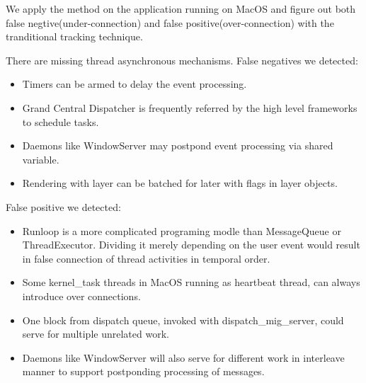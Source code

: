 \par
We apply the method on the application running on MacOS and figure out both false negtive(under-connection) and false positive(over-connection) with the tranditional tracking technique.
\par
There are missing thread asynchronous mechanisms. False negatives we detected:
\begin{itemize}
\item Timers can be armed to delay the event processing.
\item Grand Central Dispatcher is frequently referred by the high level frameworks to schedule tasks.
\item Daemons like WindowServer may postpond event processing via shared variable.
\item Rendering with layer can be batched for later with flags in layer objects.
\end{itemize}
False positive we detected:
\begin{itemize}
\item Runloop is a more complicated programing modle than MessageQueue or ThreadExecutor.
Dividing it merely depending on the user event would result in false connection of thread activities in temporal order.
\item Some kernel\_task threads in MacOS running as heartbeat thread, can always introduce over connections.
\item One block from dispatch queue, invoked with dispatch\_mig\_server, could serve for multiple unrelated work.
\item Daemons like WindowServer will also serve for different work in interleave manner to support postponding processing of messages.
\end{itemize}
\par
